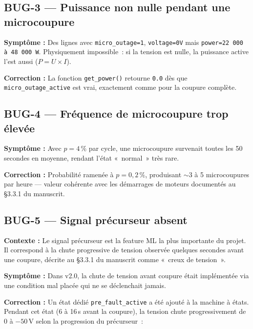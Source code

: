 \documentclass[12pt,a4paper]{article}
\begin{document}
\subsection{BUG-3 — Puissance non nulle pendant une microcoupure}

\begin{mdframed}[style=danger]
\textbf{Symptôme :} Des lignes avec \texttt{micro\_outage=1},
\texttt{voltage=0V} mais \texttt{power=22 000 à 48 000 W}.
Physiquement impossible~: si la tension est nulle, la puissance
active l'est aussi ($P = U \times I$).
\end{mdframed}

\textbf{Correction :} La fonction \texttt{get\_power()} retourne
\texttt{0.0} dès que \texttt{micro\_outage\_active} est vrai,
exactement comme pour la coupure complète.

\subsection{BUG-4 — Fréquence de microcoupure trop élevée}

\textbf{Symptôme :} Avec $p = 4\,\%$ par cycle, une microcoupure
survenait toutes les 50 secondes en moyenne, rendant l'état
«~normal~» très rare.

\textbf{Correction :} Probabilité ramenée à $p = 0{,}2\,\%$,
produisant $\sim$3 à 5 microcoupures par heure — valeur
cohérente avec les démarrages de moteurs documentés au
§3.3.1 du manuscrit.

\subsection{BUG-5 — Signal précurseur absent}

\begin{mdframed}[style=warn]
\textbf{Contexte :} Le signal précurseur est la feature ML la
plus importante du projet. Il correspond à la chute progressive
de tension observée quelques secondes avant une coupure, décrite
au §3.3.1 du manuscrit comme «~creux de tension~».
\end{mdframed}

\textbf{Symptôme :} Dans v2.0, la chute de tension avant coupure
était implémentée via une condition mal placée qui ne se
déclenchait jamais.

\textbf{Correction :} Un état dédié \texttt{pre\_fault\_active}
a été ajouté à la machine à états. Pendant cet état (6 à 16\,s
avant la coupure), la tension chute progressivement de 0 à
$-50$\,V selon la progression du précurseur~:
\end{document}
